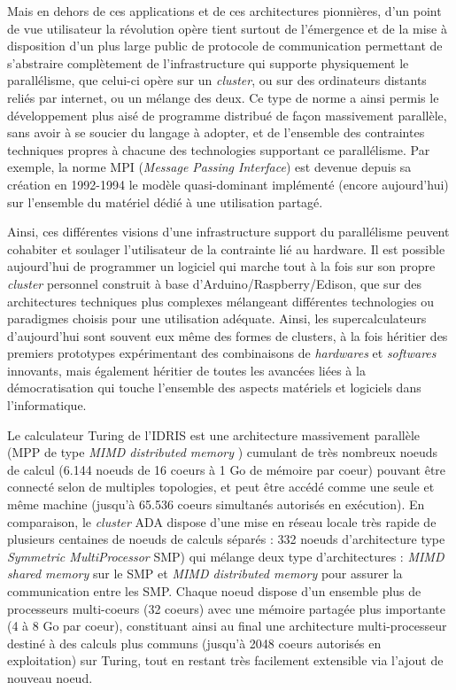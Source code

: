 Mais en dehors de ces applications et de ces architectures pionnières, d’un point de vue utilisateur la révolution opère tient surtout de l’émergence et de la mise à disposition d’un plus large public de protocole de communication permettant de s’abstraire complètement de l’infrastructure qui supporte physiquement le parallélisme, que celui-ci opère sur un \textit{cluster}, ou sur des ordinateurs distants reliés par internet, ou un mélange des deux. Ce type de norme a ainsi permis le développement plus aisé de programme distribué de façon massivement parallèle, sans avoir à se soucier du langage à adopter, et de l’ensemble des contraintes techniques propres à chacune des technologies supportant ce parallélisme. Par exemple, la norme MPI (\textit{Message Passing Interface}) est devenue depuis sa création en 1992-1994 le modèle quasi-dominant implémenté (encore aujourd’hui) sur l’ensemble du matériel dédié à une utilisation partagé.

Ainsi, ces différentes visions d'une infrastructure support du parallélisme peuvent cohabiter et soulager l'utilisateur de la contrainte lié au hardware. Il est possible aujourd'hui de programmer un logiciel qui marche tout à la fois sur son propre \textit{cluster} personnel construit à base d'Arduino/Raspberry/Edison, que sur des architectures techniques plus complexes mélangeant différentes technologies ou paradigmes choisis pour une utilisation adéquate. Ainsi, les supercalculateurs d'aujourd'hui sont souvent eux même des formes de clusters, à la fois héritier des premiers prototypes expérimentant des combinaisons de \textit{hardwares} et \textit{softwares} innovants, mais également héritier de toutes les avancées liées à la démocratisation qui touche l'ensemble des aspects matériels et logiciels dans l'informatique.

Le calculateur Turing de l'IDRIS  est une architecture massivement parallèle (MPP de type \textit{MIMD distributed memory} \autocite{Snir2011}) cumulant de très nombreux noeuds de calcul (6.144 noeuds de 16 coeurs à 1 Go de mémoire par coeur) pouvant être connecté selon de multiples topologies, et peut être accédé comme une seule et même machine (jusqu'à 65.536 coeurs simultanés autorisés en exécution). En comparaison, le \textit{cluster} ADA dispose d'une mise en réseau locale très rapide de plusieurs centaines de noeuds de calculs séparés : 332 noeuds d'architecture type \textit{Symmetric MultiProcessor} SMP) qui mélange deux type d'architectures : \textit{MIMD shared memory} sur le SMP et \textit{MIMD distributed memory} pour assurer la communication entre les SMP. Chaque noeud dispose d'un ensemble plus de processeurs multi-coeurs (32 coeurs) avec une mémoire partagée plus importante (4 à 8 Go par coeur), constituant ainsi au final une architecture multi-processeur destiné à des calculs plus communs (jusqu'à 2048 coeurs autorisés en exploitation) sur Turing, tout en restant très facilement extensible via l'ajout de nouveau noeud.

